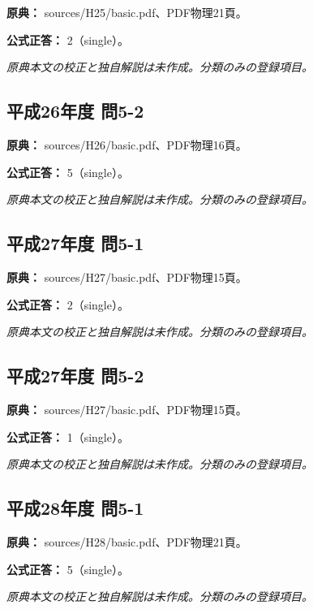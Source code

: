 \noindent\textbf{原典：} sources/H25/basic.pdf、PDF物理21頁。

\textbf{公式正答：} 2（single）。

\par\textit{原典本文の校正と独自解説は未作成。分類のみの登録項目。}

\subsection{平成26年度 問5-2}
\label{q:h26-reg-basic-5-2}

\noindent\textbf{原典：} sources/H26/basic.pdf、PDF物理16頁。

\textbf{公式正答：} 5（single）。

\par\textit{原典本文の校正と独自解説は未作成。分類のみの登録項目。}

\subsection{平成27年度 問5-1}
\label{q:h27-reg-basic-5-1}

\noindent\textbf{原典：} sources/H27/basic.pdf、PDF物理15頁。

\textbf{公式正答：} 2（single）。

\par\textit{原典本文の校正と独自解説は未作成。分類のみの登録項目。}

\subsection{平成27年度 問5-2}
\label{q:h27-reg-basic-5-2}

\noindent\textbf{原典：} sources/H27/basic.pdf、PDF物理15頁。

\textbf{公式正答：} 1（single）。

\par\textit{原典本文の校正と独自解説は未作成。分類のみの登録項目。}

\subsection{平成28年度 問5-1}
\label{q:h28-reg-basic-5-1}

\noindent\textbf{原典：} sources/H28/basic.pdf、PDF物理21頁。

\textbf{公式正答：} 5（single）。

\par\textit{原典本文の校正と独自解説は未作成。分類のみの登録項目。}


